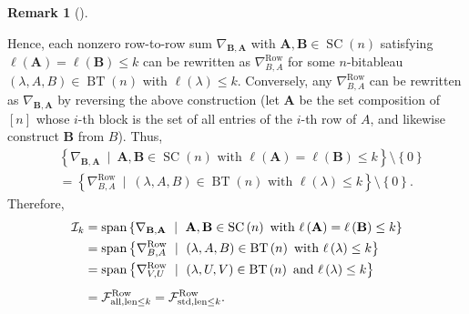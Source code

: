 \documentclass[numbers=enddot,12pt,final,onecolumn,notitlepage]{scrartcl}%
\numberwithin{exer}{subsection}
\theoremstyle{definition}
\newtheorem{remk}[theo]{Remark}
\newenvironment{remark}[1][]
{\begin{remk}[#1]\begin{leftbar}}
{\end{leftbar}\end{remk}}
\newcommand{\MurpF}{\vphantom{\int_g^g}\mathcal{F}}
\begin{document}
\begin{remark}
\begin{itemize}
Hence, each nonzero row-to-row sum $\nabla_{\mathbf{B},\mathbf{A}}$ with
$\mathbf{A},\mathbf{B}\in\operatorname*{SC}\left(  n\right)  $ satisfying
$\ell\left(  \mathbf{A}\right)  =\ell\left(  \mathbf{B}\right)  \leq k$ can be
rewritten as $\nabla_{B,A}^{\operatorname*{Row}}$ for some $n$-bitableau
$\left(  \lambda,A,B\right)  \in\operatorname*{BT}\left(  n\right)  $ with
$\ell\left(  \lambda\right)  \leq k$. Conversely, any $\nabla_{B,A}%
^{\operatorname*{Row}}$ can be rewritten as $\nabla_{\mathbf{B},\mathbf{A}}$
by reversing the above construction (let $\mathbf{A}$ be the set composition
of $\left[  n\right]  $ whose $i$-th block is the set of all entries of the
$i$-th row of $A$, and likewise construct $\mathbf{B}$ from $B$). Thus,%
\begin{align*}
&  \left\{  \nabla_{\mathbf{B},\mathbf{A}}\ \mid\ \mathbf{A},\mathbf{B}%
\in\operatorname*{SC}\left(  n\right)  \text{ with }\ell\left(  \mathbf{A}%
\right)  =\ell\left(  \mathbf{B}\right)  \leq k\right\}  \setminus\left\{
0\right\} \\
&  =\left\{  \nabla_{B,A}^{\operatorname*{Row}}\ \mid\ \left(  \lambda
,A,B\right)  \in\operatorname*{BT}\left(  n\right)  \text{ with }\ell\left(
\lambda\right)  \leq k\right\}  \setminus\left\{  0\right\}  .
\end{align*}
Therefore,%
\begin{align}
\mathcal{I}_{k}  &  =\operatorname*{span}\left\{  \nabla_{\mathbf{B}%
,\mathbf{A}}\ \mid\ \mathbf{A},\mathbf{B}\in\operatorname*{SC}\left(
n\right)  \text{ with }\ell\left(  \mathbf{A}\right)  =\ell\left(
\mathbf{B}\right)  \leq k\right\} \nonumber\\
&  =\operatorname*{span}\left\{  \nabla_{B,A}^{\operatorname*{Row}}%
\ \mid\ \left(  \lambda,A,B\right)  \in\operatorname*{BT}\left(  n\right)
\text{ with }\ell\left(  \lambda\right)  \leq k\right\} \nonumber\\
&  =\operatorname*{span}\left\{  \nabla_{V,U}^{\operatorname*{Row}}%
\ \mid\ \left(  \lambda,U,V\right)  \in\operatorname*{BT}\left(  n\right)
\text{ and }\ell\left(  \lambda\right)  \leq k\right\} \nonumber\\
&  =\MurpF_{\operatorname*{all},\operatorname*{len}\leq k}%
^{\operatorname*{Row}}=\MurpF_{\operatorname*{std},\operatorname*{len}\leq
k}^{\operatorname*{Row}}. \label{eq.rmk.IJ=murphy.I}%
\end{align}



\end{itemize}
\end{remark}
\end{document}
